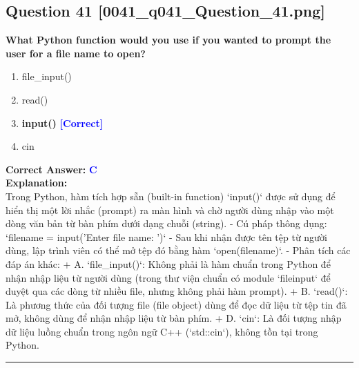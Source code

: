 \documentclass[11pt,a4paper]{article}
\begin{document}
\begin{minipage}{\textwidth}
\subsection*{Question 41 \quad \footnotesize{[0041_q041_Question_41.png]}}
\noindent \textbf{What Python function would you use if you wanted to prompt the user for a file name to open?}

\begin{enumerate}[label=\Alph*.]
    \item file_input()
    \item read()
    \item \textbf{input()} \hfill \textcolor{blue}{\textbf{[Correct]}}
    \item cin
\end{enumerate}

\noindent \textbf{Correct Answer:} \textcolor{blue}{\textbf{C}} \\[4pt]
\noindent \textbf{Explanation:}\\
Trong Python, hàm tích hợp sẵn (built-in function) `input()` được sử dụng để hiển thị một lời nhắc (prompt) ra màn hình và chờ người dùng nhập vào một dòng văn bản từ bàn phím dưới dạng chuỗi (string).\newline
- Cú pháp thông dụng: `filename = input('Enter file name: ')`\newline
- Sau khi nhận được tên tệp từ người dùng, lập trình viên có thể mở tệp đó bằng hàm `open(filename)`.\newline
- Phân tích các đáp án khác:\newline
  + A. `file_input()`: Không phải là hàm chuẩn trong Python để nhận nhập liệu từ người dùng (trong thư viện chuẩn có module `fileinput` để duyệt qua các dòng từ nhiều file, nhưng không phải hàm prompt).\newline
  + B. `read()`: Là phương thức của đối tượng file (file object) dùng để đọc dữ liệu từ tệp tin đã mở, không dùng để nhận nhập liệu từ bàn phím.\newline
  + D. `cin`: Là đối tượng nhập dữ liệu luồng chuẩn trong ngôn ngữ C++ (`std::cin`), không tồn tại trong Python.
\end{minipage}
\vspace{0.8cm}
\hrule
\vspace{0.5cm}
\end{document}
